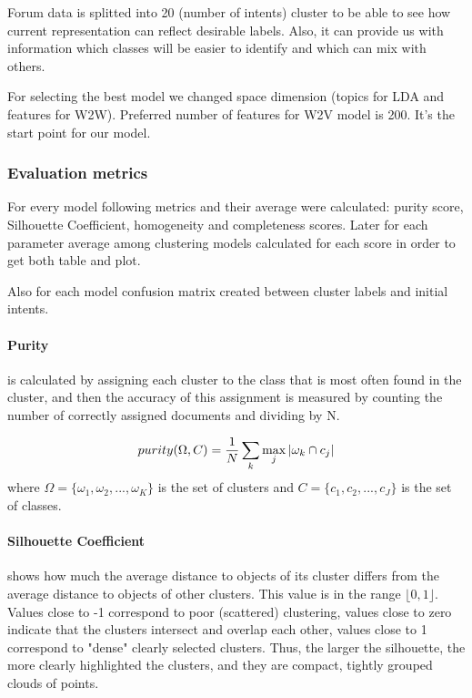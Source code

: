 \documentclass[11pt]{article}
\begin{document}
Forum data is splitted into 20 (number of intents) cluster to be able to see how current representation can reflect desirable labels. Also, it can provide us with information which classes will be easier to identify and which can mix with others.


For selecting the best model we changed space dimension (topics for LDA and features for W2W). Preferred number of features for W2V model is 200. It's the start point for our model.

\subsubsection{Evaluation metrics}

For every model following metrics and their average were calculated: purity score, Silhouette Coefficient, homogeneity and completeness scores. Later for each parameter average among clustering models calculated for each score in order to get both table and plot.

Also for each model confusion matrix created between cluster labels and initial intents.

\paragraph{Purity} is calculated by assigning each cluster to the class that is most often found in the cluster, and then the accuracy of this assignment is measured by counting the number of correctly assigned documents and dividing by N.

\begin{equation}
\centering
purity(\Omega,C) =\frac{1}{N} \sum_{k} \max_{j}|\omega_{k}\cap c_{j}|
\end{equation}
where $\Omega=\{\omega_{1}, \omega_{2}, ... ,\omega_{K}\}$ is the set of clusters and $C = \{c_{1}, c_{2}, ... , c_{J}\}$ is the set of classes. 

\paragraph{Silhouette Coefficient} shows how much the average distance to objects of its cluster differs from the average distance to objects of other clusters. This value is in the range $\lfloor 0, 1\rfloor$. Values close to -1 correspond to poor (scattered) clustering, values close to zero indicate that the clusters intersect and overlap each other, values close to 1 correspond to "dense" clearly selected clusters. Thus, the larger the silhouette, the more clearly highlighted the clusters, and they are compact, tightly grouped clouds of points.
\end{document}
